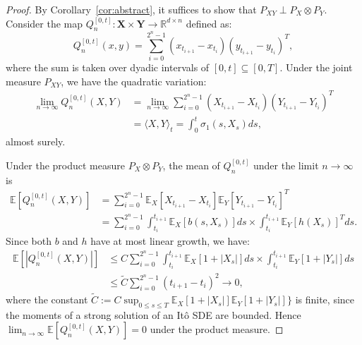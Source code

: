 \documentclass[10pt,a4paper]{amsart}
\begin{document}
\begin{proof}
    By Corollary~\ref{cor:abstract}, it suffices to show that $P_{XY} \perp P_X\otimes P_Y$. Consider the map $Q_n^{[0,t]}:\mathbf{X}\times\mathbf{Y}\to \mathbb{R}^{d\times n}$ defined as:
    \begin{equation}
        Q_n^{[0,t]}(x,y) = \sum_{i=0}^{2^n-1}(x_{t_{i+1}}-x_{t_i})(y_{t_{i+1}}-y_{t_i})^T,
    \end{equation}
    where the sum is taken over dyadic intervals of $[0,t]\subseteq[0,T]$.
    Under the joint measure $P_{XY}$, we have the quadratic variation:
    \begin{align*}
        \lim_{n\to\infty}Q_n^{[0,t]}(X,Y)  &= \lim_{n\to\infty}\sum_{i=0}^{2^n-1}(X_{t_{i+1}}-X_{t_i})(Y_{t_{i+1}}-Y_{t_i})^T\\
        &= \langle X,Y\rangle_t = \int_0^t\sigma_1(s,X_s)ds,
    \end{align*}
    almost surely.

    Under the product measure $P_X\otimes P_Y$, the mean of $Q_n^{[0,t]}$ under the limit $n\to\infty$ is
    \begin{align*}
        \mathbb{E}[Q_n^{[0,t]}(X,Y)] &= \sum_{i=0}^{2^n-1} \mathbb{E}_X[X_{t_{i+1}}-X_{t_i}]\mathbb{E}_Y[Y_{t_{i+1}}-Y_{t_i}]^T \\
         &= \sum_{i=0}^{2^n-1}\int_{t_i}^{t_{i+1}}\mathbb{E}_X\left[b(s,X_s)\right]ds\times\int_{t_i}^{t_{i+1}}\mathbb{E}_Y\left[h(X_s)\right]^Tds.
    \end{align*}
    Since both $b$ and $h$ have at most linear growth, we have:
    \begin{align*}
        \mathbb{E}[|Q_n^{[0,t]}(X,Y)|] &\leq C\sum_{i=0}^{2^n-1}\int_{t_i}^{t_{i+1}}\mathbb{E}_X[1+|X_s|]ds\times\int_{t_i}^{t_{i+1}}\mathbb{E}_Y[1+|Y_s|]ds\\
        &\leq \tilde{C}\sum_{i=0}^{2^n-1}(t_{i+1}-t_i)^2\to0,
    \end{align*}
    where the constant $\tilde{C} := C\sup_{0\leq s\leq T}\mathbb{E}_X[1+|X_s|]\mathbb{E}_Y[1+|Y_s|]\}$ is finite, since the moments of a strong solution of an It\^o SDE are bounded. Hence $\lim_{n\to\infty}\mathbb{E}[Q_n^{[0,t]}(X,Y)] = 0$ under the product measure.


\end{proof}
\end{document}
